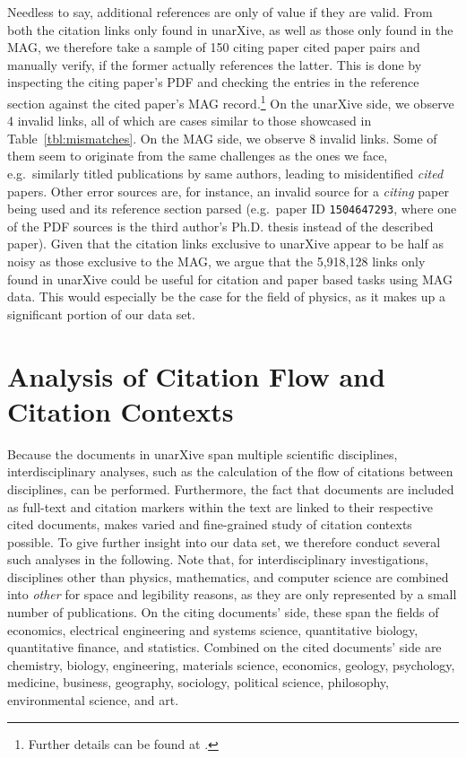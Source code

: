 Needless to say, additional references are only of value if they are valid. From both the citation links only found in unarXive, as well as those only found in the MAG, we therefore take a sample of 150 citing paper cited paper pairs and manually verify, if the former actually references the latter. This is done by inspecting the citing paper's PDF and checking the entries in the reference section against the cited paper's MAG record.\footnote{Further details can be found at .} On the unarXive side, we observe 4 invalid links, all of which are cases similar to those showcased in Table~\ref{tbl:mismatches}. On the MAG side, we observe 8 invalid links. Some of them seem to originate from the same challenges as the ones we face, e.g.\ similarly titled publications by same authors, leading to misidentified \emph{cited} papers. Other error sources are, for instance, an invalid source for a \emph{citing} paper being used and its reference section parsed (e.g.\ paper ID \texttt{1504647293}, where one of the PDF sources is the third author's Ph.D. thesis instead of the described paper). Given that the citation links exclusive to unarXive appear to be half as noisy as those exclusive to the MAG, we argue that the 5,918,128 links only found in unarXive could be useful for citation and paper based tasks using MAG data. This would especially be the case for the field of physics, as it makes up a significant portion of our data set.

\section{Analysis of Citation Flow and Citation Contexts}
\label{sec:analysis}

Because the documents in unarXive span multiple scientific disciplines, interdisciplinary analyses, such as the calculation of the flow of citations between disciplines, can be performed. Furthermore, the fact that documents are included as full-text and citation markers within the text are linked to their respective cited documents, makes varied and fine-grained study of citation contexts possible. To give further insight into our data set, we therefore conduct several such analyses in the following. Note that, for interdisciplinary investigations, disciplines other than physics, mathematics, and computer science are combined into \emph{other} for space and legibility reasons, as they are only represented by a small number of publications. On the citing documents' side, these span the fields of economics, electrical engineering and systems science, quantitative biology, quantitative finance, and statistics. Combined on the cited documents' side are chemistry, biology, engineering, materials science, economics, geology, psychology, medicine, business, geography, sociology, political science, philosophy, environmental science, and art.


